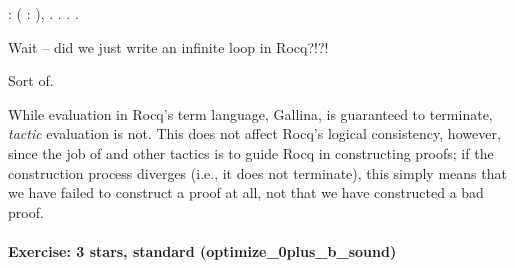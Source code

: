 \documentclass[12pt]{report}
\begin{document}
\begin{coqdoccode}
\coqdocemptyline
\coqdocnoindent
{}  : \coqdockw{\ensuremath{\forall}} (  : ),\coqdoceol
\coqdocindent{1.00em}
      .\coqdoceol
\coqdocnoindent
{}.\coqdoceol
\coqdocindent{1.00em}
  .\coqdoceol
\coqdocnoindent
{}.\coqdoceol
\coqdocemptyline
\end{coqdoccode}
Wait -- did we just write an infinite loop in Rocq?!?!


    Sort of.


    While evaluation in Rocq's term language, Gallina, is guaranteed to
    terminate, \textit{tactic} evaluation is not.  This does not affect Rocq's
    logical consistency, however, since the job of  and other
    tactics is to guide Rocq in constructing proofs; if the
    construction process diverges (i.e., it does not terminate), this
    simply means that we have failed to construct a proof at all, not
    that we have constructed a bad proof. 

\paragraph{Exercise: 3 stars, standard (optimize\_0plus\_b\_sound)}
\end{document}
